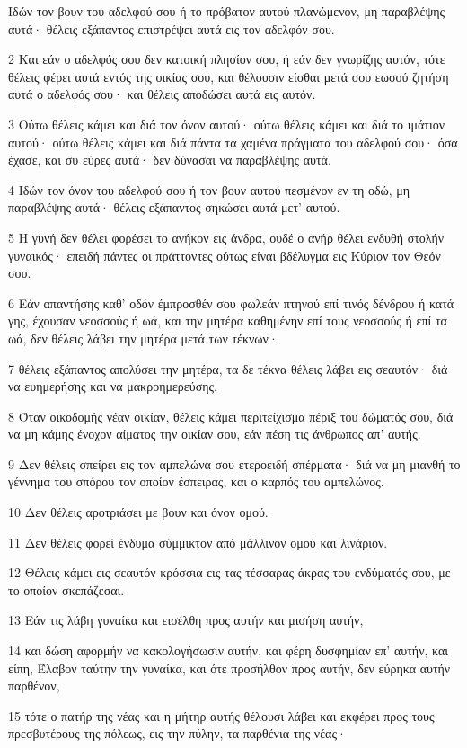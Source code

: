 \par Ιδών τον βουν του αδελφού σου ή το πρόβατον αυτού πλανώμενον, μη παραβλέψης αυτά· θέλεις εξάπαντος επιστρέψει αυτά εις τον αδελφόν σου.
\par 2 Και εάν ο αδελφός σου δεν κατοική πλησίον σου, ή εάν δεν γνωρίζης αυτόν, τότε θέλεις φέρει αυτά εντός της οικίας σου, και θέλουσιν είσθαι μετά σου εωσού ζητήση αυτά ο αδελφός σου· και θέλεις αποδώσει αυτά εις αυτόν.
\par 3 Ούτω θέλεις κάμει και διά τον όνον αυτού· ούτω θέλεις κάμει και διά το ιμάτιον αυτού· ούτω θέλεις κάμει και διά πάντα τα χαμένα πράγματα του αδελφού σου· όσα έχασε, και συ εύρες αυτά· δεν δύνασαι να παραβλέψης αυτά.
\par 4 Ιδών τον όνον του αδελφού σου ή τον βουν αυτού πεσμένον εν τη οδώ, μη παραβλέψης αυτά· θέλεις εξάπαντος σηκώσει αυτά μετ' αυτού.
\par 5 Η γυνή δεν θέλει φορέσει το ανήκον εις άνδρα, ουδέ ο ανήρ θέλει ενδυθή στολήν γυναικός· επειδή πάντες οι πράττοντες ούτως είναι βδέλυγμα εις Κύριον τον Θεόν σου.
\par 6 Εάν απαντήσης καθ' οδόν έμπροσθέν σου φωλεάν πτηνού επί τινός δένδρου ή κατά γης, έχουσαν νεοσσούς ή ωά, και την μητέρα καθημένην επί τους νεοσσούς ή επί τα ωά, δεν θέλεις λάβει την μητέρα μετά των τέκνων·
\par 7 θέλεις εξάπαντος απολύσει την μητέρα, τα δε τέκνα θέλεις λάβει εις σεαυτόν· διά να ευημερήσης και να μακροημερεύσης.
\par 8 Όταν οικοδομής νέαν οικίαν, θέλεις κάμει περιτείχισμα πέριξ του δώματός σου, διά να μη κάμης ένοχον αίματος την οικίαν σου, εάν πέση τις άνθρωπος απ' αυτής.
\par 9 Δεν θέλεις σπείρει εις τον αμπελώνα σου ετεροειδή σπέρματα· διά να μη μιανθή το γέννημα του σπόρου τον οποίον έσπειρας, και ο καρπός του αμπελώνος.
\par 10 Δεν θέλεις αροτριάσει με βουν και όνον ομού.
\par 11 Δεν θέλεις φορεί ένδυμα σύμμικτον από μάλλινον ομού και λινάριον.
\par 12 Θέλεις κάμει εις σεαυτόν κρόσσια εις τας τέσσαρας άκρας του ενδύματός σου, με το οποίον σκεπάζεσαι.
\par 13 Εάν τις λάβη γυναίκα και εισέλθη προς αυτήν και μισήση αυτήν,
\par 14 και δώση αφορμήν να κακολογήσωσιν αυτήν, και φέρη δυσφημίαν επ' αυτήν, και είπη, Έλαβον ταύτην την γυναίκα, και ότε προσήλθον προς αυτήν, δεν εύρηκα αυτήν παρθένον,
\par 15 τότε ο πατήρ της νέας και η μήτηρ αυτής θέλουσι λάβει και εκφέρει προς τους πρεσβυτέρους της πόλεως, εις την πύλην, τα παρθένια της νέας·
